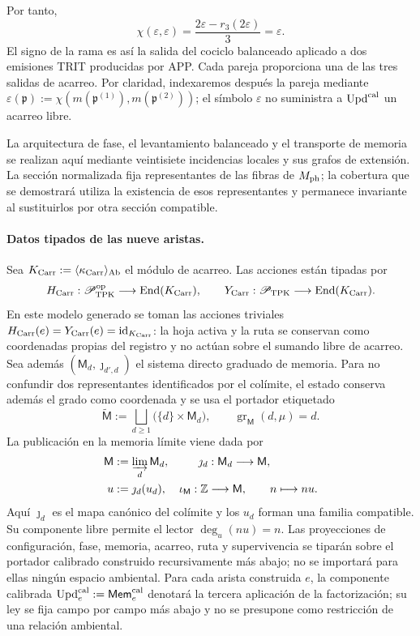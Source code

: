Por tanto,
\begin{equation}
 \chi(\varepsilon,\varepsilon)
 =\frac{2\varepsilon-r_3(2\varepsilon)}3=\varepsilon.
 \label{hmtfg:eq:carry-no-parametrico-ch}
\end{equation}
El signo de la rama es así la salida del cociclo balanceado aplicado a dos
emisiones TRIT producidas por APP. Cada pareja proporciona una de las tres
salidas de acarreo. Por claridad, indexaremos después la pareja mediante
\(\varepsilon(\mathfrak p):=
\chi(m(\mathfrak p^{(1)}),m(\mathfrak p^{(2)}))\); el símbolo
\(\varepsilon\) no suministra a \(\operatorname{Upd}^{\rm cal}\) un acarreo libre.

La arquitectura de fase, el levantamiento balanceado y el transporte de
memoria se realizan aquí mediante veintisiete incidencias locales y sus
grafos de extensión. La sección normalizada fija representantes de las
fibras de \(M_{\rm ph}\); la cobertura que se demostrará utiliza la existencia
de esos representantes y permanece invariante al sustituirlos por otra
sección compatible.

\paragraph{Datos tipados de las nueve aristas.}
Sea
\(K_{\rm Carr}:=\langle\kappa_{\rm Carr}\rangle_{\rm Ab}\) el módulo de
acarreo. Las acciones están tipadas por
\[
 H_{\rm Carr}:\mathscr P_{\rm TPK}^{\rm op}
   \longrightarrow\operatorname{End}(K_{\rm Carr}),\qquad
 Y_{\rm Carr}:\mathscr P_{\rm TPK}
   \longrightarrow\operatorname{End}(K_{\rm Carr}).
\]
En este modelo generado se toman las acciones triviales
\(H_{\rm Carr}(e)=Y_{\rm Carr}(e)=\operatorname{id}_{K_{\rm Carr}}\): la
hoja activa y la ruta se conservan como coordenadas propias del registro y no
actúan sobre el sumando libre de acarreo. Sea además
\((\mathsf M_d,\jmath_{d',d})\) el sistema directo graduado de memoria. Para
no confundir dos representantes identificados por el colímite, el estado
conserva además el grado como coordenada y se usa el portador etiquetado
\[
 \widetilde{\mathsf M}:=
 \bigsqcup_{d\ge1}\bigl(\{d\}\times\mathsf M_d\bigr),
 \qquad
 \operatorname{gr}_{\mathsf M}(d,\mu)=d.
\]
La publicación en la memoria límite viene dada por
\[
\begin{aligned}
 \mathsf M&:=\varinjlim_d\mathsf M_d,&
 \jmath_d&:\mathsf M_d\longrightarrow\mathsf M,\\
 u&:=\jmath_d(u_d),&
 \iota_{\mathsf M}:\mathbb Z&\longrightarrow\mathsf M,
 \qquad n\longmapsto nu .
\end{aligned}
\]
Aquí \(\jmath_d\) es el mapa canónico del colímite y los \(u_d\) forman una
familia compatible. Su componente libre permite
el lector \(\deg_u(nu)=n\).
Las proyecciones de configuración, fase, memoria, acarreo, ruta y
supervivencia se tiparán sobre el portador calibrado construido
recursivamente más abajo; no se importará para ellas ningún espacio ambiental.
Para cada arista construida \(e\), la
componente calibrada
\(\operatorname{Upd}^{\rm cal}_e:=\mathsf{Mem}^{\rm cal}_e\) denotará la
tercera aplicación de la factorización; su ley se fija campo por campo más
abajo y no se presupone como restricción de una relación ambiental.

